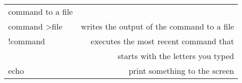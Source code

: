 \documentclass{article}
\begin{document}
\begin{table}
\begin{center}
\begin{tabular}{l|r}
                        command to a file \\
                        command \textgreater file & writes the output of the
                        command to a file \\
                        !command & executes the most recent command
                        that \\
                         & starts with the letters you typed \\
                        echo & print something to the screen \\
                 \end{tabular}
        \end{center}
\end{table}
                        
                        
\end{document}
